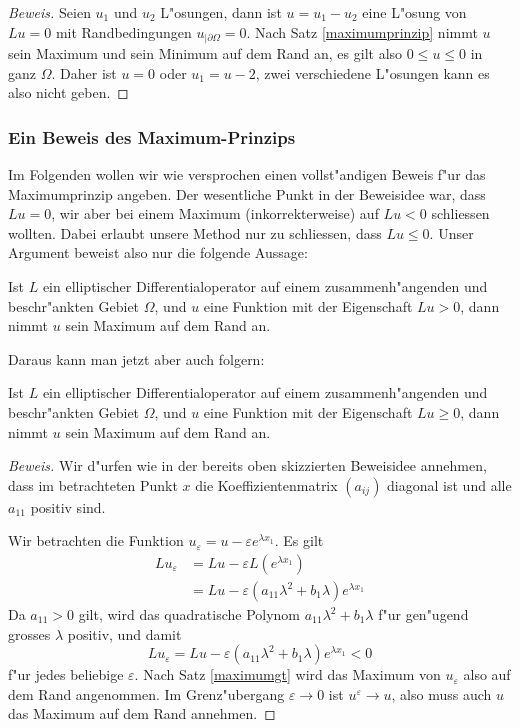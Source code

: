 \begin{proof}[Beweis]
Seien $u_1$ und $u_2$ L"osungen, dann ist $u=u_1-u_2$ eine L"osung 
von $Lu=0$ mit Randbedingungen $u_{|\partial\Omega}=0$. Nach Satz
\ref{maximumprinzip} nimmt $u$ sein Maximum und sein Minimum auf dem Rand an,
es gilt
also $0\le u\le 0$ in ganz $\Omega$.
Daher ist $u=0$ oder $u_1=u-2$,
zwei verschiedene L"osungen kann es also nicht geben.
\end{proof}

{\small
\subsubsection{Ein Beweis des Maximum-Prinzips}
Im Folgenden wollen wir wie versprochen einen vollst"andigen Beweis f"ur das
Maximumprinzip angeben. Der wesentliche Punkt in der Beweisidee
war, dass $Lu=0$, wir aber bei einem Maximum (inkorrekterweise)
auf $Lu<0$ schliessen wollten. Dabei erlaubt unsere Method nur zu
schliessen, dass $Lu\le 0$.
Unser Argument beweist also nur die folgende Aussage:
\begin{satz}
\label{maximumgt}
Ist $L$ ein elliptischer Differentialoperator auf einem zusammenh"angenden
und beschr"ankten Gebiet $\Omega$,
und $u$ eine Funktion mit der Eigenschaft $Lu>0$,
dann nimmt $u$ sein Maximum auf dem Rand an.
\end{satz}

Daraus kann man jetzt aber auch folgern:
\begin{satz}
Ist $L$ ein elliptischer Differentialoperator auf einem zusammenh"angenden
und beschr"ankten Gebiet $\Omega$,
und $u$ eine Funktion mit der Eigenschaft $Lu\ge0$,
dann nimmt $u$ sein Maximum auf dem Rand an.
\end{satz}

\begin{proof}[Beweis]
Wir d"urfen wie in der bereits oben skizzierten Beweisidee annehmen,
dass im betrachteten Punkt $x$ die Koeffizientenmatrix $(a_{ij})$
diagonal ist und alle $a_{11}$ positiv sind.

Wir betrachten die Funktion $u_{\varepsilon}=u-\varepsilon e^{\lambda x_1}$.
Es gilt
\begin{align*}
Lu_{\varepsilon}&=Lu-\varepsilon L(e^{\lambda x_1})\\
&=Lu-\varepsilon(a_{11}\lambda^2+b_1\lambda)e^{\lambda x_1}
\end{align*}
Da $a_{11}>0$ gilt, wird das quadratische Polynom $a_{11}\lambda^2+b_1\lambda$
f"ur gen"ugend grosses $\lambda$ positiv, und damit 
\[
Lu_{\varepsilon}= Lu-\varepsilon(a_{11}\lambda^2+b_1\lambda)e^{\lambda x_1}<0
\]
f"ur jedes beliebige $\varepsilon$. Nach Satz \ref{maximumgt} wird das Maximum
von $u_\varepsilon$ also auf dem Rand angenommen.
Im Grenz"ubergang $\varepsilon\to 0$ ist $u^\varepsilon\to u$, also
muss auch $u$ das Maximum auf dem Rand annehmen.
\end{proof}

}
